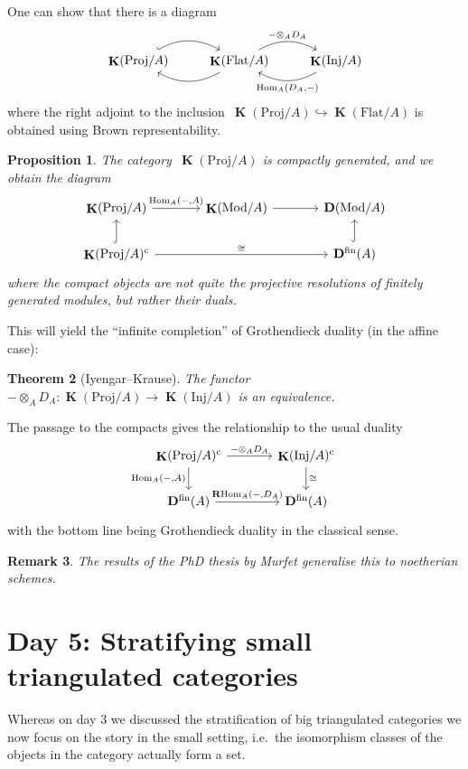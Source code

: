 \documentclass[10pt,a4paper]{article}
\theoremstyle{lecture}
\newtheorem{theorem}{Theorem}
\newtheorem{proposition}[theorem]{Proposition}
\newtheorem{remark}[theorem]{Remark}
\newcommand\cc{\ensuremath{\mathrm{c}}}
\newcommand\derived{\ensuremath{\mathbf{D}}}
\newcommand\fin{\ensuremath{\mathrm{fin}}}
\newcommand\Flat{\ensuremath{\mathrm{Flat}}}
\newcommand\Inj{\ensuremath{\mathrm{Inj}}}
\newcommand\Mod{\ensuremath{\mathrm{Mod}}}
\DeclareMathOperator\Hom{Hom}
\DeclareMathOperator\KKK{\mathbf{K}}
\DeclareMathOperator\RRRHom{\mathbf{R}Hom}
\begin{document}
One can show that there is a diagram
\begin{equation}
  \begin{tikzcd}
    \KKK(\mathrm{Proj}/A) \arrow[bend left, hook]{r} & \KKK(\Flat/A) \arrow[bend left]{l} \arrow[bend left]{r}{-\otimes_A D_A} & \KKK(\Inj/A) \arrow[bend left]{l}{\Hom_A(D_A,-)}
  \end{tikzcd}
\end{equation}
where the right adjoint to the inclusion~$\KKK(\mathrm{Proj}/A)\hookrightarrow\KKK(\Flat/A)$ is obtained using Brown representability.
\begin{proposition}
  The category~$\KKK(\mathrm{Proj}/A)$ is compactly generated, and we obtain the diagram
  \begin{equation}
    \begin{tikzcd}[column sep = large]
      \KKK(\mathrm{Proj}/A) \arrow{r}{\Hom_A(-,A)} & \KKK(\Mod/A) \arrow{r} & \derived(\Mod/A) \\
      \KKK(\mathrm{Proj}/A)^\cc \arrow[hook]{u} \arrow{rr}{\cong} & & \derived^\fin(A) \arrow[hook]{u}
    \end{tikzcd}
  \end{equation}
  where the compact objects are not quite the projective resolutions of finitely generated modules, but rather their duals.
\end{proposition}
This will yield the ``infinite completion'' of Grothendieck duality (in the affine case):
\begin{theorem}[Iyengar--Krause]
  The functor~$-\otimes_AD_A\colon\KKK(\mathrm{Proj}/A)\to\KKK(\Inj/A)$ is an equivalence.
\end{theorem}
The passage to the compacts gives the relationship to the usual duality
\begin{equation}
  \begin{tikzcd}[column sep = large]
    \KKK(\mathrm{Proj}/A)^\cc \arrow{r}{-\otimes_AD_A} \arrow{d}[swap]{\Hom_A(-,A)} & \KKK(\Inj/A)^\cc \arrow{d}{\cong} \\
    \derived^\fin(A) \arrow{r}{\RRRHom_A(-,D_A)} & \derived^\fin(A)
  \end{tikzcd}
\end{equation}
with the bottom line being Grothendieck duality in the classical sense.

\begin{remark}
  The results of the PhD thesis by Murfet generalise this to noetherian schemes.
\end{remark}


\section{Day 5: Stratifying small triangulated categories}
Whereas on day 3 we discussed the stratification of big triangulated categories we now focus on the story in the small setting, i.e.\ the isomorphism classes of the objects in the category actually form a set.
\end{document}
